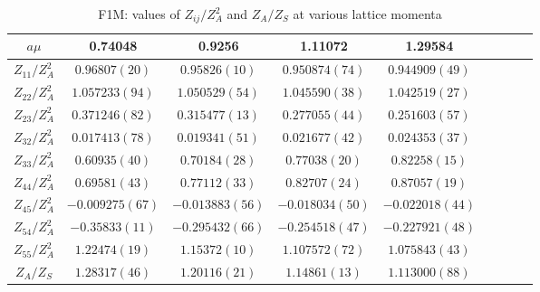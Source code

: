 \begin{table}
\begin{center}
\caption{\label{tab:F1Mrenormvals}F1M: values of $Z_{ij}/Z_A^2$ and $Z_A/Z_S$ at various lattice momenta}
\begin{tabular}{c|c c c c c c c c}
\hline
\hline
$a\mu$ & 0.74048 & 0.9256 & 1.11072 & 1.29584 \\
\hline
$Z_{11}/Z_A^2$ & $0.96807(20)$ & $0.95826(10)$ & $0.950874(74)$ & $0.944909(49)$ \\
\hline
$Z_{22}/Z_A^2$ & $1.057233(94)$ & $1.050529(54)$ & $1.045590(38)$ & $1.042519(27)$ \\
$Z_{23}/Z_A^2$ & $0.371246(82)$ & $0.315477(13)$ & $0.277055(44)$ & $0.251603(57)$ \\
$Z_{32}/Z_A^2$ & $0.017413(78)$ & $0.019341(51)$ & $0.021677(42)$ & $0.024353(37)$ \\
$Z_{33}/Z_A^2$ & $0.60935(40)$ & $0.70184(28)$ & $0.77038(20)$ & $0.82258(15)$ \\
\hline
$Z_{44}/Z_A^2$ & $0.69581(43)$ & $0.77112(33)$ & $0.82707(24)$ & $0.87057(19)$ \\
$Z_{45}/Z_A^2$ & $-0.009275(67)$ & $-0.013883(56)$ & $-0.018034(50)$ & $-0.022018(44)$ \\
$Z_{54}/Z_A^2$ & $-0.35833(11)$ & $-0.295432(66)$ & $-0.254518(47)$ & $-0.227921(48)$ \\
$Z_{55}/Z_A^2$ & $1.22474(19)$ & $1.15372(10)$ & $1.107572(72)$ & $1.075843(43)$ \\
\hline
$Z_A/Z_S$ & $1.28317(46)$ & $1.20116(21)$ & $1.14861(13)$ & $1.113000(88)$ \\
\hline
\hline
\end{tabular}
\end{center}
\end{table}